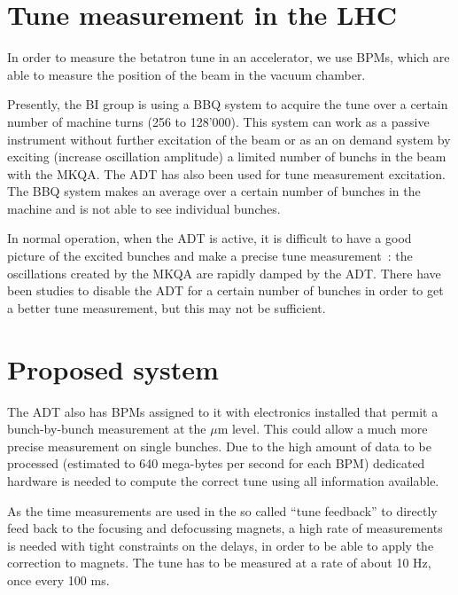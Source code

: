 \section{Tune measurement in the LHC}

In order to measure the betatron tune in an accelerator, we use
\glspl{BPM}, which are able to measure the position of the beam in the
vacuum chamber.

Presently, the \gls{BI} group is using a \gls{BBQ} \cite{Boccardi:1156349} system to acquire the tune over a certain number of machine turns (256 to 128'000). This system can work as a passive instrument without further excitation of the beam or as an on demand system by exciting (increase oscillation amplitude) a limited number of \glspl{bunch} in the beam with the \gls{MKQA}. The \Gls{ADT} has also been used for tune measurement excitation\cite{HofleEvian10}. The \gls{BBQ} system makes an average over a certain number of bunches in the machine and is not able to see individual bunches.

In normal operation, when the \gls{ADT} is active, it is difficult to have a good picture of the excited bunches and make a precise tune measurement~: the oscillations created by the \gls{MKQA} are rapidly damped by the \gls{ADT}. There have been studies to disable the \gls{ADT} for a certain number of bunches in order to get a better tune measurement\cite{HofleEvian11}, but this may not be sufficient.

\section{Proposed system}

The \gls{ADT} also has \glspl{BPM} assigned to it with electronics installed that permit a bunch-by-bunch measurement at the $\mu$m level\cite{BphMeas07}. This could allow a much more precise measurement on single bunches. Due to the high amount of data to be processed (estimated to 640 mega-bytes per second for each \gls{BPM}) dedicated hardware is needed to compute the correct tune using all information available\cite{HofleChamonix12}.

As the time measurements are used in the so called ``tune feedback'' to directly feed back to the focusing and defocussing magnets, a high rate of measurements is needed with tight constraints on the delays, in order to be able to apply the correction to magnets. The \gls{tune} has to be measured at a rate of about 10 Hz, once every 100 ms.

